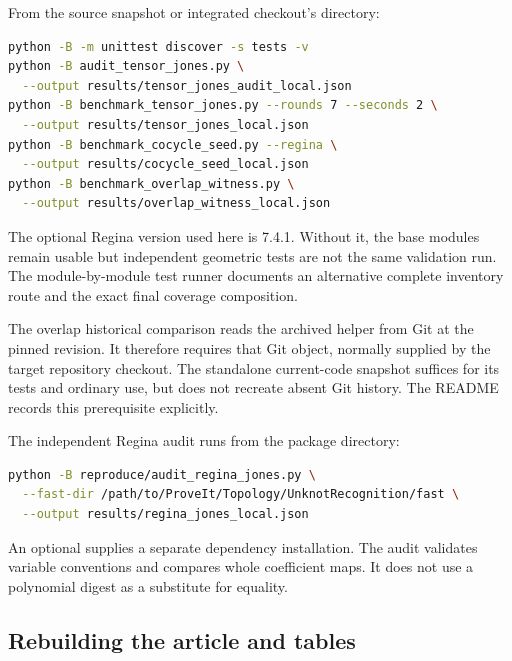From the source snapshot or integrated checkout's  directory:
\par\noindent\begin{minipage}{\linewidth}
\begin{lstlisting}[language=bash]
python -B -m unittest discover -s tests -v
python -B audit_tensor_jones.py \
  --output results/tensor_jones_audit_local.json
python -B benchmark_tensor_jones.py --rounds 7 --seconds 2 \
  --output results/tensor_jones_local.json
python -B benchmark_cocycle_seed.py --regina \
  --output results/cocycle_seed_local.json
python -B benchmark_overlap_witness.py \
  --output results/overlap_witness_local.json
\end{lstlisting}
\end{minipage}\par

The optional Regina version used here is 7.4.1. Without it, the base modules
remain usable but independent geometric tests are not the same validation
run. The module-by-module test runner documents an alternative complete
inventory route and the exact final coverage composition.

The overlap historical comparison reads the archived helper from Git at the
pinned revision. It therefore requires that Git object, normally supplied by
the target repository checkout. The standalone current-code snapshot suffices
for its tests and ordinary use, but does not recreate absent Git history.
The README records this prerequisite explicitly.

The independent Regina audit runs from the package directory:
\par\noindent\begin{minipage}{\linewidth}
\begin{lstlisting}[language=bash]
python -B reproduce/audit_regina_jones.py \
  --fast-dir /path/to/ProveIt/Topology/UnknotRecognition/fast \
  --output results/regina_jones_local.json
\end{lstlisting}
\end{minipage}\par

An optional \code{--regina-path} supplies a separate dependency installation.
The audit validates variable conventions and compares whole coefficient
maps. It does not use a polynomial digest as a substitute for equality.

\subsection{Rebuilding the article and tables}

